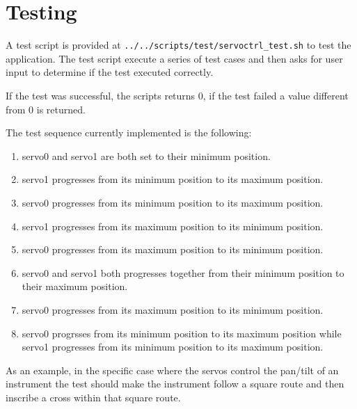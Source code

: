 \section{Testing}
A test script is provided at \texttt{../../scripts/test/servoctrl\_test.sh} to
test the application. The test script execute a series of test cases and then
asks for user input to determine if the test executed correctly.

If the test was successful, the scripts returns 0, if the test failed a value
different from 0 is returned.

The test sequence currently implemented is the following:

   \begin{enumerate}
      \item servo0 and servo1 are both set to their minimum position.
      \item servo1 progresses from its minimum position to its maximum position.
      \item servo0 progresses from its minimum position to its maximum position.
      \item servo1 progresses from its maximum position to its minimum position.
      \item servo0 progresses from its maximum position to its minimum position.
      \item servo0 and servo1 both progresses together from their minimum
         position to their maximum position.
      \item servo0 progresses from its maximum position to its minimum position.
      \item servo0 progrsses from its minimum position to its maximum position
         while servo1 progresses from its minimum position to its maximum
         position.
   \end{enumerate}

As an example, in the specific case where the servos control the pan/tilt of an
instrument the test should make the instrument follow a square route and then
inscribe a cross within that square route.
